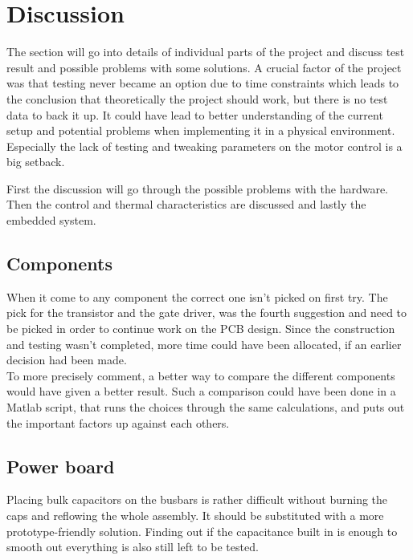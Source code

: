 \section{Discussion}
\label{sec:discussion}

The section will go into details of individual parts of the project and discuss test result and possible problems with some solutions. 
A crucial factor of the project was that testing never became an option due to time constraints which leads to the conclusion that theoretically the project should work, but there is no test data to back it up. 
It could have lead to better understanding of the current setup and potential problems when implementing it in a physical environment. 
Especially the lack of testing and tweaking parameters on the motor control is a big setback. 

First the discussion will go through the possible problems with the hardware. Then the control and thermal characteristics are discussed and lastly the embedded system.




\subsection{Components}
When it come to any component the correct one isn't picked on first try. The pick for the transistor and the gate driver, was the fourth suggestion and need to be picked in order to continue work on the PCB design. Since the construction and testing wasn't completed, more time could have been allocated, if an earlier decision had been made. \\

To more precisely comment, a better way to compare the different components would have given a better result. Such a comparison could have been done in a Matlab script, that runs the choices through the same calculations, and puts out the important factors up against each others. \\

\subsection{Power board}
Placing bulk capacitors on the busbars is rather difficult without burning the caps and reflowing the whole assembly. It should be substituted with a more prototype-friendly solution. Finding out if the capacitance built in is enough to smooth out everything is also still left to be tested.

